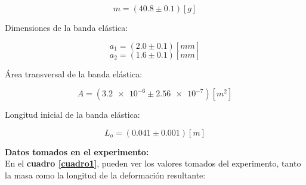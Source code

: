\documentclass[letter,11pt]{article}
\begin{document}
\begin{equation*}
    m = (40.8 \pm 0.1)[g]
\end{equation*}
\vspace{0.10cm}

Dimensiones de la banda elástica:

\begin{equation*}
    a_1 = (2.0 \pm 0.1)[mm]
\end{equation*}
\begin{equation*}
    a_2 = (1.6 \pm 0.1)[mm]
\end{equation*}
\vspace{0.10cm}

Área transversal de la banda elástica:

\begin{equation*}
    A = (\num{3.2e-6} \pm \num{2.56e-7})[m^2]
\end{equation*}
\vspace{0.10cm}

Longitud inicial de la banda elástica:

\begin{equation*}
    L_o = (0.041 \pm 0.001)[m]
\end{equation*}

\vspace{0.35cm}
\textbf{Datos tomados en el experimento:} \\

En el \textbf{cuadro \ref{cuadro1}}, pueden ver los valores tomados del 
experimento, tanto la masa como la longitud de la deformación resultante:
\end{document}
